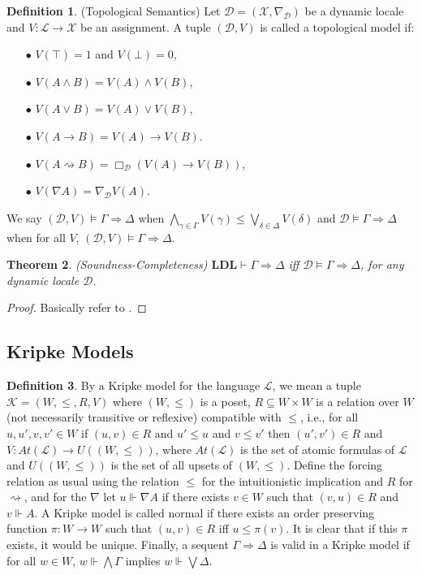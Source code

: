 \documentclass[12pt,a4paper]{article}
\theoremstyle{plain}
\newtheorem{thm}{Theorem}[section]
\theoremstyle{definition}
\newtheorem{dfn}[thm]{Definition}
\begin{document}
\begin{dfn}\label{t4-1}(Topological Semantics)
Let $\mathcal{D}=(\mathscr{X}, \nabla_{\mathcal{D}})$ be a dynamic locale and $V:\mathcal{L} \to\mathscr{X}$ be an assignment. A tuple $(\mathcal{D}, V)$ is called a topological model if:
\begin{itemize}
\item[$\bullet$]
$V(\top)=1$ and $V(\bot)=0$,
\item[$\bullet$]
$V(A \wedge B)=V(A) \wedge V(B)$,
\item[$\bullet$]
$V(A \vee B)=V(A) \vee V(B)$,
\item[$\bullet$]
$V(A \rightarrow B)= V(A) \rightarrow V(B)$.
\item[$\bullet$]
$V(A \rightsquigarrow B)= \Box_{\mathcal{D}} (V(A) \rightarrow V(B))$,
\item[$\bullet$]
$V(\nabla A)=\nabla_{\mathcal{D}} V(A)$.
\end{itemize}
We say $(\mathcal{D}, V) \vDash \Gamma \Rightarrow \Delta$ when $\bigwedge_{\gamma \in \Gamma} V(\gamma) \leq \bigvee_{\delta \in \Delta} V(\delta)$ and $\mathcal{D} \vDash \Gamma \Rightarrow \Delta$ when for all $V$, $(\mathcal{D}, V) \vDash \Gamma \Rightarrow \Delta$.
\end{dfn}

\begin{thm}\label{t4-2}(Soundness-Completeness) $ \mathbf{LDL} \vdash \Gamma \Rightarrow \Delta$ iff $\mathcal{D} \vDash \Gamma \Rightarrow \Delta$, for any dynamic locale $\mathcal{D}$.


\end{thm}
\begin{proof}
Basically refer to \cite{Amir}.
\end{proof}

\subsection{Kripke Models} \label{KripkeModels}

\begin{dfn}
By a Kripke model for the language $\mathcal{L}$, we mean a tuple $\mathcal{K}=(W, \leq, R, V)$ where $(W, \leq)$ is a poset, $R \subseteq W \times W$ is a relation over $W$ (not necessarily transitive or reflexive) compatible with $\leq$, i.e., for all $u, u', v, v' \in W$ if $(u, v) \in R$ and $u' \leq u$ and $v \leq v'$ then $(u', v') \in R$ and $V: At(\mathcal{L}) \to U((W, \leq))$, where $At(\mathcal{L})$ is the set of atomic formulas of $\mathcal{L}$ and $U((W, \leq))$ is the set of all upsets of $(W, \leq)$. Define the forcing relation as usual using the relation $\leq$ for the intuitionistic implication and $R$ for $\rightsquigarrow$, and for the $\nabla$ let $u \Vdash \nabla A$ if there exists $v \in W$ such that $(v, u) \in R$ and $v \Vdash A$. A Kripke model is called normal if there exists an order preserving function $\pi : W \to W$ such that $(u, v) \in R$ iff $u \leq \pi(v)$. It is clear that if this $\pi$ exists, it would be unique. Finally, a sequent $\Gamma \Rightarrow \Delta$ is valid in a Kripke model if for all $w \in W$, $w \Vdash \bigwedge \Gamma$ implies $w \Vdash \bigvee \Delta$.
\end{dfn}
\end{document}
